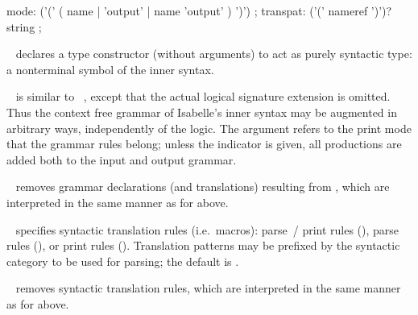\begin{isabellebody}
\begin{isamarkuptext}
\begin{rail}
    mode: ('(' ( name | 'output' | name 'output' ) ')')
    ;
    transpat: ('(' nameref ')')? string
    ;
  \end{rail}

  \begin{description}
  
  \item \hyperlink{command.nonterminals}{\mbox{}}~ declares a type
  constructor  (without arguments) to act as purely syntactic
  type: a nonterminal symbol of the inner syntax.

  \item \hyperlink{command.syntax}{\mbox{}}~ is similar to
  \hyperlink{command.consts}{\mbox{}}~, except that the actual logical
  signature extension is omitted.  Thus the context free grammar of
  Isabelle's inner syntax may be augmented in arbitrary ways,
  independently of the logic.  The  argument refers to the
  print mode that the grammar rules belong; unless the \hyperlink{keyword.output}{\mbox{}} indicator is given, all productions are added both to the
  input and output grammar.
  
  \item \hyperlink{command.no-syntax}{\mbox{}}~ removes grammar
  declarations (and translations) resulting from , which
  are interpreted in the same manner as for \hyperlink{command.syntax}{\mbox{}} above.
  
  \item \hyperlink{command.translations}{\mbox{}}~ specifies syntactic
  translation rules (i.e.\ macros): parse~/ print rules (\isa{{\isachardoublequote}{\isasymrightleftharpoons}{\isachardoublequote}}),
  parse rules (\isa{{\isachardoublequote}{\isasymrightharpoonup}{\isachardoublequote}}), or print rules (\isa{{\isachardoublequote}{\isasymleftharpoondown}{\isachardoublequote}}).
  Translation patterns may be prefixed by the syntactic category to be
  used for parsing; the default is .
  
  \item \hyperlink{command.no-translations}{\mbox{}}~ removes syntactic
  translation rules, which are interpreted in the same manner as for
  \hyperlink{command.translations}{\mbox{}} above.


\end{description}
\end{isamarkuptext}
\end{isabellebody}
